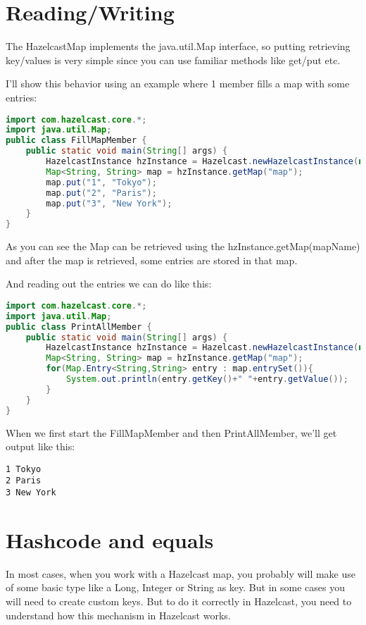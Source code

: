 \section{Reading/Writing}
The HazelcastMap implements the java.util.Map interface, so putting retrieving key/values is very simple since you can use familiar methods like get/put etc.

I'll show this behavior using an example where 1 member fills a map with some entries:
\begin{lstlisting}[language=java]
import com.hazelcast.core.*;
import java.util.Map;
public class FillMapMember {
    public static void main(String[] args) {
        HazelcastInstance hzInstance = Hazelcast.newHazelcastInstance(null);
        Map<String, String> map = hzInstance.getMap("map");
        map.put("1", "Tokyo");
        map.put("2", "Paris");
        map.put("3", "New York");
    }
}
\end{lstlisting}
As you can see the Map can be retrieved using the hzInstance.getMap(mapName) and after the map is retrieved, some entries are stored in that map. 

And reading out the entries we can do like this:
\begin{lstlisting}[language=java]
import com.hazelcast.core.*;
import java.util.Map;
public class PrintAllMember {
    public static void main(String[] args) {
        HazelcastInstance hzInstance = Hazelcast.newHazelcastInstance(null);
        Map<String, String> map = hzInstance.getMap("map");
        for(Map.Entry<String,String> entry : map.entrySet()){
            System.out.println(entry.getKey()+" "+entry.getValue());
        }
    }
}
\end{lstlisting}
When we first start the FillMapMember and then PrintAllMember, we'll get output like this:
\begin{lstlisting}
1 Tokyo
2 Paris
3 New York
\end{lstlisting}

\section{Hashcode and equals}
In most cases, when you work with a Hazelcast map, you probably will make use of some basic type like a  Long, Integer or String as key. But in some cases you will need to create custom keys. But to do it correctly in Hazelcast, you need to understand how this mechanism in Hazelcast works. 

